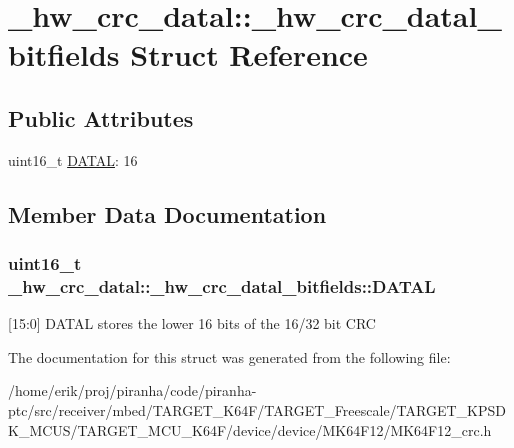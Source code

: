 \hypertarget{struct__hw__crc__datal_1_1__hw__crc__datal__bitfields}{}\section{\+\_\+hw\+\_\+crc\+\_\+datal\+:\+:\+\_\+hw\+\_\+crc\+\_\+datal\+\_\+bitfields Struct Reference}
\label{struct__hw__crc__datal_1_1__hw__crc__datal__bitfields}
\subsection*{Public Attributes}
\begin{DoxyCompactItemize}
\item 
uint16\+\_\+t \hyperlink{struct__hw__crc__datal_1_1__hw__crc__datal__bitfields_a9ccfd29b7b9a689560a7e06550d47fea}{D\+A\+T\+AL}\+: 16
\end{DoxyCompactItemize}


\subsection{Member Data Documentation}
\subsubsection[{\texorpdfstring{D\+A\+T\+AL}{DATAL}}]{\setlength{\rightskip}{0pt plus 5cm}uint16\+\_\+t \+\_\+hw\+\_\+crc\+\_\+datal\+::\+\_\+hw\+\_\+crc\+\_\+datal\+\_\+bitfields\+::\+D\+A\+T\+AL}\hypertarget{struct__hw__crc__datal_1_1__hw__crc__datal__bitfields_a9ccfd29b7b9a689560a7e06550d47fea}{}\label{struct__hw__crc__datal_1_1__hw__crc__datal__bitfields_a9ccfd29b7b9a689560a7e06550d47fea}
\mbox{[}15\+:0\mbox{]} D\+A\+T\+AL stores the lower 16 bits of the 16/32 bit C\+RC 

The documentation for this struct was generated from the following file\+:\begin{DoxyCompactItemize}
\item 
/home/erik/proj/piranha/code/piranha-\/ptc/src/receiver/mbed/\+T\+A\+R\+G\+E\+T\+\_\+\+K64\+F/\+T\+A\+R\+G\+E\+T\+\_\+\+Freescale/\+T\+A\+R\+G\+E\+T\+\_\+\+K\+P\+S\+D\+K\+\_\+\+M\+C\+U\+S/\+T\+A\+R\+G\+E\+T\+\_\+\+M\+C\+U\+\_\+\+K64\+F/device/device/\+M\+K64\+F12/M\+K64\+F12\+\_\+crc.\+h\end{DoxyCompactItemize}
